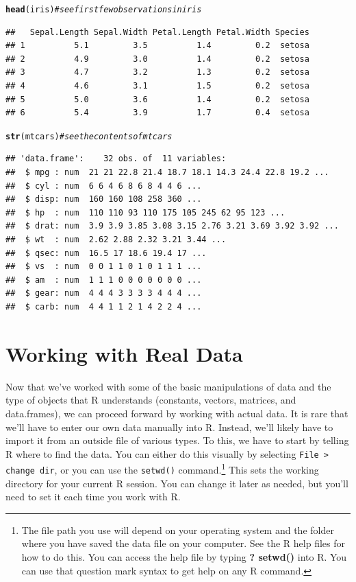 \documentclass[12pt]{article}\usepackage[]{graphicx}\usepackage[]{color}
\makeatletter
\newcommand{\hlcom}[1]{\textcolor[rgb]{0.678,0.584,0.686}{\textit{#1}}}%
\newcommand{\hlstd}[1]{\textcolor[rgb]{0.345,0.345,0.345}{#1}}%
\newcommand{\hlkwd}[1]{\textcolor[rgb]{0.737,0.353,0.396}{\textbf{#1}}}%
\newenvironment{kframe}{%
 \def\at@end@of@kframe{}%
 \ifinner\ifhmode%
  \def\at@end@of@kframe{\end{minipage}}%
  \begin{minipage}{\columnwidth}%
 \fi\fi%
 \def\FrameCommand##1{\hskip\@totalleftmargin \hskip-\fboxsep
 \colorbox{shadecolor}{##1}\hskip-\fboxsep
     \hskip-\linewidth \hskip-\@totalleftmargin \hskip\columnwidth}%
 \MakeFramed {\advance\hsize-\width
   \@totalleftmargin\z@ \linewidth\hsize
   \@setminipage}}%
 {\par\unskip\endMakeFramed%
 \at@end@of@kframe}
\newenvironment{knitrout}{}{} %
\makeatother
\begin{document}
\begin{knitrout}
\color{fgcolor}\begin{kframe}
\begin{alltt}
\hlkwd{head}\hlstd{(iris)} \hlcom{# see first few observations in iris}
\end{alltt}
\begin{verbatim}
##   Sepal.Length Sepal.Width Petal.Length Petal.Width Species
## 1          5.1         3.5          1.4         0.2  setosa
## 2          4.9         3.0          1.4         0.2  setosa
## 3          4.7         3.2          1.3         0.2  setosa
## 4          4.6         3.1          1.5         0.2  setosa
## 5          5.0         3.6          1.4         0.2  setosa
## 6          5.4         3.9          1.7         0.4  setosa
\end{verbatim}
\begin{alltt}
\hlkwd{str}\hlstd{(mtcars)} \hlcom{# see the contents of mtcars}
\end{alltt}
\begin{verbatim}
## 'data.frame':	32 obs. of  11 variables:
##  $ mpg : num  21 21 22.8 21.4 18.7 18.1 14.3 24.4 22.8 19.2 ...
##  $ cyl : num  6 6 4 6 8 6 8 4 4 6 ...
##  $ disp: num  160 160 108 258 360 ...
##  $ hp  : num  110 110 93 110 175 105 245 62 95 123 ...
##  $ drat: num  3.9 3.9 3.85 3.08 3.15 2.76 3.21 3.69 3.92 3.92 ...
##  $ wt  : num  2.62 2.88 2.32 3.21 3.44 ...
##  $ qsec: num  16.5 17 18.6 19.4 17 ...
##  $ vs  : num  0 0 1 1 0 1 0 1 1 1 ...
##  $ am  : num  1 1 1 0 0 0 0 0 0 0 ...
##  $ gear: num  4 4 4 3 3 3 3 4 4 4 ...
##  $ carb: num  4 4 1 1 2 1 4 2 2 4 ...
\end{verbatim}
\end{kframe}
\end{knitrout}



\section{Working with Real Data}\label{sec:data}
Now that we've worked with some of the basic manipulations of data and the type of objects that R understands (constants, vectors, matrices, and data.frames), we can proceed forward by working with actual data. It is rare that we'll have to enter our own data manually into R. Instead, we'll likely have to import it from an outside file of various types. To this, we have to start by telling R where to find the data. You can either do this visually by selecting \texttt{File > change dir}, or you can use the \texttt{setwd()} command.\footnote{The file path you use will depend on your operating system and the folder where you have saved the data file on your computer. See the R help files for how to do this. You can access the help file by typing \textbf{? setwd()} into R. You can use that question mark syntax to get help on any R command.} This sets the working directory for your current R session. You can change it later as needed, but you'll need to set it each time you work with R.
\end{document}
